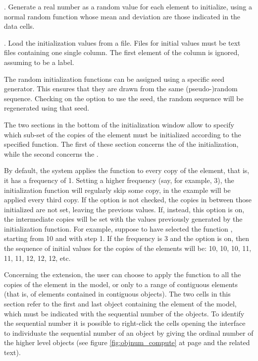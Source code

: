 \documentclass [11pt,a4paper] {book}
\begin{document}
. Generate a real number as a random value for each element to initialize, using a normal random function whose mean and deviation are those indicated in the data cells.

. Load the initialization values from a file. Files for initial values must be text files containing one single column. The first element of the column is ignored, assuming to be a label.

The random initialization functions can be assigned using a specific seed generator. This ensures that they are drawn from the same (pseudo-)random sequence. Checking on the option to use the seed, the random sequence will be regenerated using that seed.

The two sections in the bottom of the initialization window allow to specify which sub-set of the copies of the element must be initialized according to the specified function. The first of these section concerns the  of the initialization, while the second concerns the . 

By default, the system applies the function to every copy of the element, that is, it has a frequency of 1. Setting a higher frequency (say, for example, 3), the initialization function will regularly skip some copy, in the example will be applied every third copy. If the option  is not checked, the copies in between those initialized are not set, leaving the previous values. If, instead, this option is on, the intermediate copies will be set with the values previously generated by the initialization function. For example, suppose to have selected the function , starting from 10 and with step 1. If the frequency is 3 and the option  is on, then the sequence of initial values for the copies of the elements will be: 10, 10, 10, 11, 11, 11, 12, 12, 12, etc.

Concerning the extension, the user can choose to apply the function to all the copies of the element in the model, or only to a range of contiguous elements (that is, of elements contained in contiguous objects). The two cells in this section refer to the first and last object containing the element of the model, which must be indicated with the sequential number of the objects. To identify the sequential number it is possible to right-click the cells opening the interface to individuate the sequential number of an object by giving the ordinal number of the higher level objects (see figure \ref{fig:objnum_compute} at page \pageref{fig:objnum_compute} and the related text).
\end{document}
